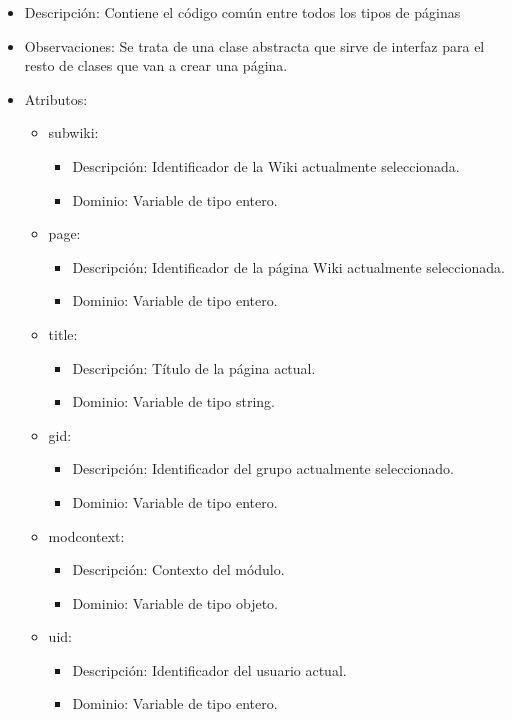 \begin{itemize}
	\item Descripción: Contiene el código común entre todos los tipos de páginas
	\item Observaciones: Se trata de una clase abstracta que sirve de interfaz para el resto de clases que van a crear una página.
	\item Atributos:
		\begin{itemize}
			\item subwiki:
				\begin{itemize}
					\item Descripción: Identificador de la Wiki actualmente seleccionada.
					\item Dominio: Variable de tipo entero.
				\end{itemize}
			\item page:
				\begin{itemize}
					\item Descripción: Identificador de la página Wiki actualmente seleccionada.
					\item Dominio: Variable de tipo entero.
				\end{itemize}
			\item title:
				\begin{itemize}
					\item Descripción: Título de la página actual.
					\item Dominio: Variable de tipo string.
				\end{itemize}
			\item gid:
				\begin{itemize}
					\item Descripción: Identificador del grupo actualmente seleccionado.
					\item Dominio: Variable de tipo entero.
				\end{itemize}
			\item modcontext:
				\begin{itemize}
					\item Descripción: Contexto del módulo.
					\item Dominio: Variable de tipo objeto.
				\end{itemize}
			\item uid:
				\begin{itemize}
					\item Descripción: Identificador del usuario actual.
					\item Dominio: Variable de tipo entero.
				\end{itemize}

\end{itemize}
\end{itemize}

